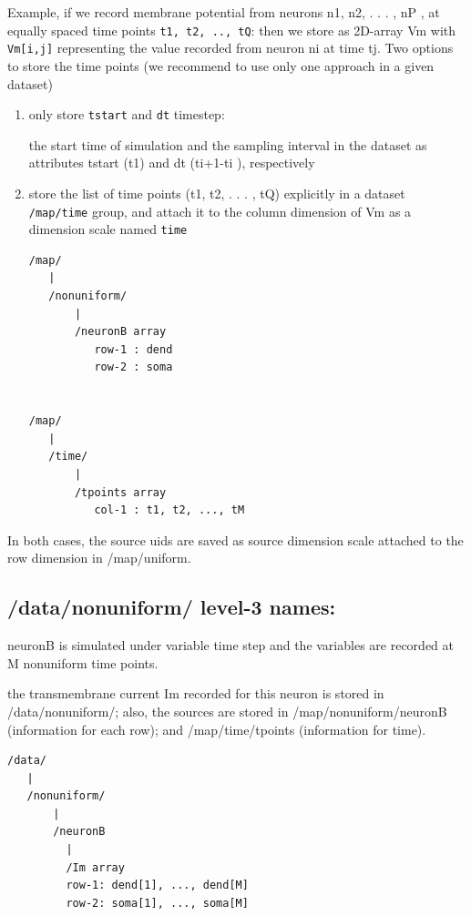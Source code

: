 Example, if we record membrane potential from neurons n1, n2, . . . , nP , at
equally spaced time points \verb!t1, t2, .., tQ!: then we store as 2D-array
Vm with \verb!Vm[i,j]! representing the value recorded from neuron ni at time
tj. Two options to store the time points (we recommend to use only one approach
in a given dataset)
\begin{enumerate}

  \item only store \verb!tstart! and \verb!dt! timestep: 
  
  the start time of simulation and the sampling interval in the dataset as
  attributes tstart (t1) and dt (ti+1-ti ), respectively


  \item store the list of time points (t1, t2, . . . , tQ) explicitly in a
  dataset \verb!/map/time! group, and attach it to the column dimension of Vm as
  a dimension scale named \verb!time!

\begin{verbatim}
/map/
   |
   /nonuniform/
       |
       /neuronB array 
          row-1 : dend
          row-2 : soma


/map/
   |
   /time/
       |
       /tpoints array 
          col-1 : t1, t2, ..., tM
\end{verbatim}

\end{enumerate}
In both cases, the source uids are saved as source dimension scale attached to
the row dimension in /map/uniform.

\subsection{/data/nonuniform/ level-3 names: }
\label{sec:NSDF-format-/data/nonuniform/-level-3}

neuronB is simulated under variable time step and the variables are recorded at M nonuniform
time points.

the transmembrane current Im recorded for this
neuron is stored in /data/nonuniform/; also, the sources
are stored in /map/nonuniform/neuronB (information for each row); and
/map/time/tpoints (information for time).

\begin{verbatim}
/data/
   |
   /nonuniform/
       |
       /neuronB 
         |
         /Im array
         row-1: dend[1], ..., dend[M]
         row-2: soma[1], ..., soma[M]
\end{verbatim}

